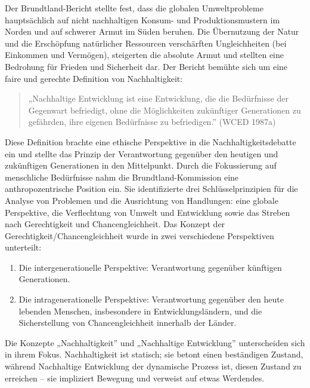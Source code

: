 \documentclass[
  nswissgerman,
  a4paper,
  openany]{book}
\providecommand{\tightlist}{%
  \setlength{\itemsep}{0pt}\setlength{\parskip}{0pt}}
\begin{document}
Der Brundtland-Bericht stellte fest, dass die globalen Umweltprobleme
hauptsächlich auf nicht nachhaltigen Konsum- und Produktionsmustern im
Norden und auf schwerer Armut im Süden beruhen. Die Übernutzung der
Natur und die Erschöpfung natürlicher Ressourcen verschärften
Ungleichheiten (bei Einkommen und Vermögen), steigerten die absolute
Armut und stellten eine Bedrohung für Frieden und Sicherheit dar. Der
Bericht bemühte sich um eine faire und gerechte Definition von
Nachhaltigkeit:

\begin{quote}
„Nachhaltige Entwicklung ist eine Entwicklung, die die Bedürfnisse der
Gegenwart befriedigt, ohne die Möglichkeiten zukünftiger Generationen zu
gefährden, ihre eigenen Bedürfnisse zu befriedigen.'' (WCED 1987a)
\end{quote}

Diese Definition brachte eine ethische Perspektive in die
Nachhaltigkeitsdebatte ein und stellte das Prinzip der Verantwortung
gegenüber den heutigen und zukünftigen Generationen in den Mittelpunkt.
Durch die Fokussierung auf menschliche Bedürfnisse nahm die
Brundtland-Kommission eine anthropozentrische Position ein. Sie
identifizierte drei Schlüsselprinzipien für die Analyse von Problemen
und die Ausrichtung von Handlungen: eine globale Perspektive, die
Verflechtung von Umwelt und Entwicklung sowie das Streben nach
Gerechtigkeit und Chancengleichheit. Das Konzept der
Gerechtigkeit/Chancengleichheit wurde in zwei verschiedene Perspektiven
unterteilt:

\begin{enumerate}
\def\labelenumi{\arabic{enumi}.}
\tightlist
\item
  Die intergenerationelle Perspektive: Verantwortung gegenüber künftigen
  Generationen.
\item
  Die intragenerationelle Perspektive: Verantwortung gegenüber den heute
  lebenden Menschen, insbesondere in Entwicklungsländern, und die
  Sicherstellung von Chancengleichheit innerhalb der Länder.
\end{enumerate}

\begin{tcolorbox}[enhanced jigsaw, arc=.35mm, bottomrule=.15mm, bottomtitle=1mm, breakable, colback=white, colbacktitle=quarto-callout-note-color!10!white, colframe=quarto-callout-note-color-frame, coltitle=black, left=2mm, leftrule=.75mm, opacityback=0, opacitybacktitle=0.6, rightrule=.15mm, title={Nachhaltigkeit und Nachhaltige Entwicklung}, titlerule=0mm, toprule=.15mm, toptitle=1mm]

Die Konzepte „Nachhaltigkeit'' und „Nachhaltige Entwicklung''
unterscheiden sich in ihrem Fokus. Nachhaltigkeit ist statisch; sie
betont einen beständigen Zustand, während Nachhaltige Entwicklung der
dynamische Prozess ist, diesen Zustand zu erreichen -- sie impliziert
Bewegung und verweist auf etwas Werdendes.

\end{tcolorbox}
\end{document}

